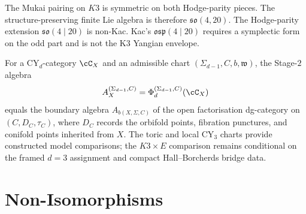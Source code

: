 \begin{lemma}
The Mukai pairing on \(K3\) is symmetric on both Hodge-parity pieces.
The structure-preserving finite Lie algebra is therefore
\(\mathfrak{so}(4,20)\).  The Hodge-parity extension
\(\mathfrak{so}(4\mid20)\) is non-Kac.  Kac's
\(\mathfrak{osp}(4\mid20)\) requires a symplectic form on the odd part
and is not the K3 Yangian envelope.
\end{lemma}

\begin{conjecture}
\ClaimStatusConjectured
For a CY\(_d\)-category \(\cC_X\) and an admissible chart
\((\Sigma_{d-1},C,b,\mathfrak w)\), the Stage-\(2\) algebra
\[
A_X^{(\Sigma_{d-1},C)}=\Phi_d^{(\Sigma_{d-1},C)}(\cC_X)
\]
equals the boundary algebra \(A_{b(X,\Sigma,C)}\) of the open
factorisation dg-category on \((C,D_C,\tau_C)\), where \(D_C\) records
the orbifold points, fibration punctures, and conifold points inherited
from \(X\).  The toric and local CY$_3$ charts provide constructed
model comparisons; the \(K3\times E\) comparison remains conditional on
the framed \(d=3\) assignment and compact Hall--Borcherds bridge data.
\end{conjecture}

\section{Non-Isomorphisms}
\label{sec:tas-collapses}

